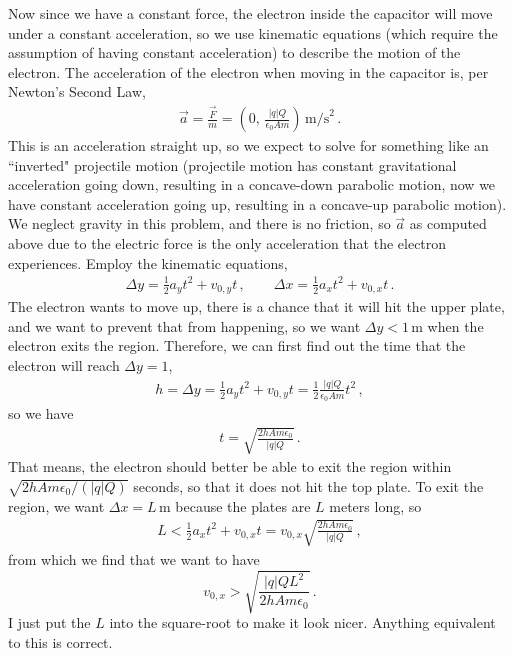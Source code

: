\documentclass[11pt]{article}
\begin{document}
Now since we have a constant force, the electron inside the capacitor will move under a constant acceleration, so we use kinematic equations (which require the assumption of having constant acceleration) to describe the motion of the electron. The acceleration of the electron when moving in the capacitor is, per Newton's Second Law, 
\begin{align*}
\vec{a} = \frac{\vec{F}}{m} = \left(0,\, \frac{|q|Q}{\epsilon_0 Am} \right)\,\text{m/s}^2\,.
\end{align*}
This is an acceleration straight up, so we expect to solve for something like an ``inverted" projectile motion (projectile motion has constant gravitational acceleration going down, resulting in a concave-down parabolic motion, now we have constant acceleration going up, resulting in a concave-up parabolic motion). We neglect gravity in this problem, and there is no friction, so $\vec{a}$ as computed above due to the electric force is the only acceleration that the electron experiences. Employ the kinematic equations, 
\begin{align*}
\Delta y = \frac{1}{2}a_y t^2 + v_{0,y} t\,,\qquad
\Delta x = \frac{1}{2}a_x t^2 + v_{0,x} t\,.
\end{align*}
The electron wants to move up, there is a chance that it will hit the upper plate, and we want to prevent that from happening, so we want $\Delta y < 1$\,m when the electron exits the region. Therefore, we can first find out the time that the electron will reach $\Delta y = 1$, 
\begin{align*}
h=\Delta y = \frac{1}{2}a_y t^2 + v_{0,y}t = \frac{1}{2}\frac{|q|Q}{\epsilon_0 Am} t^2 \,,
\end{align*}
so we have
\begin{align*}
t = \sqrt{\frac{2h Am\epsilon_0}{|q|Q}}\,.
\end{align*}
That means, the electron should better be able to exit the region within $\sqrt{2h Am\epsilon_0/(|q|Q)}$ seconds, so that it does not hit the top plate. To exit the region, we want $\Delta x = L$\,m because the plates are $L$ meters long, so 
\begin{align*}
L < \frac{1}{2}a_xt^2 + v_{0,x}t = v_{0,x}\sqrt{\frac{2h Am\epsilon_0}{|q|Q}} \,,
\end{align*}
from which we find that we want to have 
$$v_{0,x} > \sqrt{\frac{|q|QL^2}{2hAm\epsilon_0}}\,.$$ 
I just put the $L$ into the square-root to make it look nicer. Anything equivalent to this is correct. 
\end{document}
